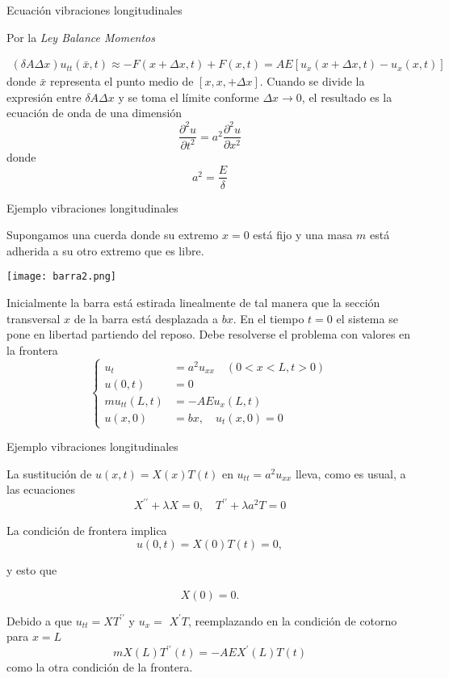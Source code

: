  
{Ecuación vibraciones longitudinales}

Por la \emph{Ley Balance Momentos}

$$
\begin{aligned}
(\delta A \Delta x) u_{t t}(\bar{x}, t)  \approx-F(x+\Delta x, t)+F(x, t) 
=A E\left[u_{x}(x+\Delta x, t)-u_{x}(x, t)\right]
\end{aligned}
$$
donde $\bar{x}$ representa el punto medio de $[x, x,+\Delta x]$. Cuando se divide la expresión entre $\delta A \Delta x$ y se toma el límite conforme $\Delta x \rightarrow 0$, el resultado es la ecuación de onda de una dimensión
$$
\frac{\partial^{2} u}{\partial t^{2}}=a^{2} \frac{\partial^{2} u}{\partial x^{2}}
$$
donde
$$
a^{2}=\frac{E}{\delta}
$$

 

 
{Ejemplo vibraciones longitudinales}

Supongamos una cuerda  donde su extremo $x=0$ está fijo y una masa $m$ está adherida a su otro extremo que es libre. 

\begin{center}
\texttt{[image: barra2.png]}
\end{center}



Inicialmente la barra está estirada linealmente de tal manera que la sección transversal $x$ de la barra está  desplazada a $b x$. En el tiempo $t=0$ el sistema se pone en libertad partiendo del reposo. Debe resolverse el problema con valores en la frontera
$$
\left\{
\begin{aligned}
u_{t} &=a^{2} u_{x x} \quad(0<x<L, t>0) \\
u(0, t) &=0 \\
m u_{t t}(L, t) &=-A E u_{x}(L, t) \\
u(x, 0) &=b x, \quad u_{t}(x, 0)=0
\end{aligned}
\right.
$$
 

 
{Ejemplo vibraciones longitudinales}

 La sustitución de $u(x, t)=X(x) T(t)$ en $u_{t t}=a^{2} u_{x x}$ lleva, como es usual, a las ecuaciones
$$
X^{\prime \prime}+\lambda X=0, \quad T^{\prime \prime}+\lambda a^{2} T=0
$$


La condición de frontera implica 
$$u(0, t)=X(0) T(t)=0,$$

y esto que

$$X(0)=0.$$


Debido a que $u_{t t}=X T^{\prime \prime}$ y $u_{x}=$ $X^{\prime} T$, reemplazando en la condición de cotorno para $x=L$  
$$
m X(L) T^{\prime \prime}(t)=-A E X^{\prime}(L) T(t)
$$
como la otra condición de la frontera. 

